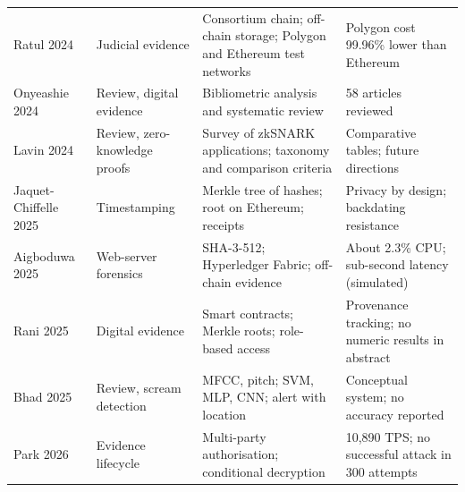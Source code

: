 \documentclass[conference,a4paper,10pt]{IEEEtran}
\begin{document}
\begin{table}[!t]
\begin{tabular}{L{2.6cm} L{2.9cm} L{6.0cm} L{5.0cm}}
\cite{ratul} Ratul 2024 & Judicial evidence & Consortium chain; off-chain storage; Polygon and Ethereum test networks & Polygon cost 99.96\% lower than Ethereum\\
\cite{onyeashie} Onyeashie 2024 & Review, digital evidence & Bibliometric analysis and systematic review & 58 articles reviewed\\
\cite{lavin} Lavin 2024 & Review, zero-knowledge proofs & Survey of zkSNARK applications; taxonomy and comparison criteria & Comparative tables; future directions\\
\cite{jaquet} Jaquet-Chiffelle 2025 & Timestamping & Merkle tree of hashes; root on Ethereum; receipts & Privacy by design; backdating resistance\\
\cite{aigboduwa} Aigboduwa 2025 & Web-server forensics & SHA-3-512; Hyperledger Fabric; off-chain evidence & About 2.3\% CPU; sub-second latency (simulated)\\
\cite{rani} Rani 2025 & Digital evidence & Smart contracts; Merkle roots; role-based access & Provenance tracking; no numeric results in abstract\\
\cite{bhad} Bhad 2025 & Review, scream detection & MFCC, pitch; SVM, MLP, CNN; alert with location & Conceptual system; no accuracy reported\\
\cite{park} Park 2026 & Evidence lifecycle & Multi-party authorisation; conditional decryption & 10,890 TPS; no successful attack in 300 attempts\\
\bottomrule
\end{tabular}
\end{table}
\end{document}
